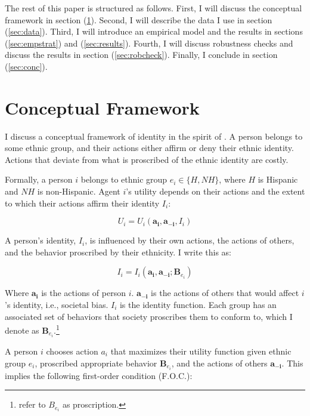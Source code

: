 \documentclass[12pt,english]{article}
\begin{document}
The rest of this paper is structured as follows. First, I will discuss the conceptual framework in section (\ref{sec:model}). Second, I will describe the data I use in section (\ref{sec:data}). Third, I will introduce an empirical model and the results in sections (\ref{sec:empstrat}) and (\ref{sec:results}). Fourth, I will discuss robustness checks and discuss the results in section (\ref{sec:robcheck}). Finally, I conclude in section (\ref{sec:conc}). 

\section{Conceptual Framework}\label{sec:model}

I discuss a conceptual framework of identity in the spirit of \textcite{akerlofEconomicsIdentity2000}. A person belongs to some ethnic group, and their actions either affirm or deny their ethnic identity. Actions that deviate from what is proscribed of the ethnic identity are costly. 

Formally, a person $i$ belongs to ethnic group $e_i \in \{H, NH\}$, where $H$ is Hispanic and $NH$ is non-Hispanic. Agent $i$'s utility depends on their actions and the extent to which their actions affirm their identity $I_i$:

\begin{equation}
U_i = U_i(\pmb{a_i}, \pmb{a_{-i}}, I_i)\label{eq:util}
\end{equation}

A person's identity, $I_i$, is influenced by their own actions, the actions of others, and the behavior proscribed by their ethnicity. I write this as:

\begin{equation}
I_i = I_i(\pmb{a_i}, \pmb{a_{-i}}; \pmb{B}_{e_{i}})\label{eq:identity}
\end{equation}

Where $\pmb{a_i}$ is the actions of person $i$. $\pmb{a_{-i}}$ is the actions of others that would affect $i$'s identity, i.e., societal bias. $I_i$ is the identity function. Each group has an associated set of behaviors that society proscribes them to conform to, which I denote as $\pmb{B}_{e_{i}}$.\footnote{\textcite{akerlofEconomicsIdentity2000} refer to $B_{e_{i}}$ as proscription.}

A person $i$ chooses action $a_i$ that maximizes their utility function given ethnic group $e_i$, proscribed appropriate behavior $\pmb{B}_{e_{i}}$, and the actions of others $\pmb{a_{-i}}$. This implies the following first-order condition (F.O.C.):
\end{document}
